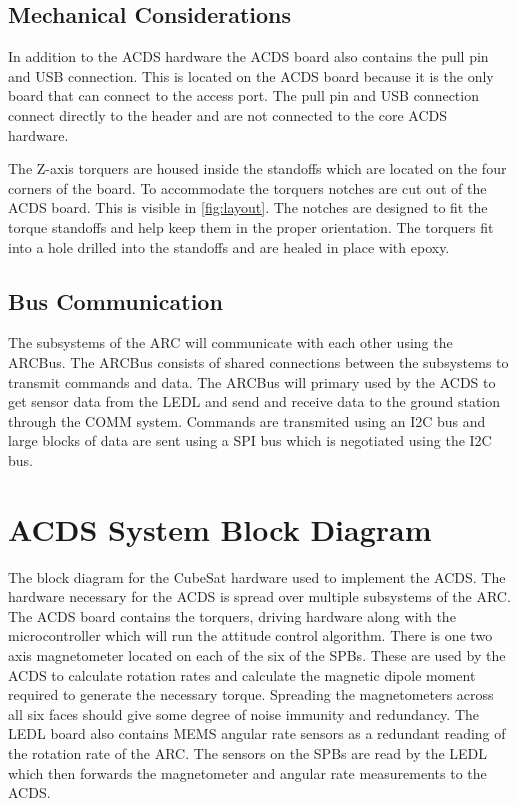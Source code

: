 \subsection{Mechanical Considerations}
In addition to the \ac{ACDS} hardware the \ac{ACDS} board also contains the pull pin and USB connection. This is located on the \ac{ACDS} board because it is the only board that can connect to the access port. The pull pin and USB connection connect directly to the header and are not connected to the core \ac{ACDS} hardware. 

The Z-axis torquers are housed inside the standoffs which are located on the four corners of the board. To accommodate the torquers notches are cut out of the \ac{ACDS} board. This is visible in \autoref{fig:layout}. The notches are designed to fit the torque standoffs and help keep them in the proper orientation. The torquers fit into a hole drilled into the standoffs and are healed in place with epoxy. 


\subsection{Bus Communication}

The subsystems of the \ac{ARC} will communicate with each other using the ARCBus. The ARCBus consists of shared connections between the subsystems to transmit commands and data. The ARCBus will primary used by the \ac{ACDS} to get sensor data from the \ac{LEDL} and send and receive data to the ground station through the COMM system. Commands are transmited using an \ac{I2C} bus and large blocks of data are sent using a SPI bus which is negotiated using the \ac{I2C} bus.

\section{\acl{ACDS} System Block Diagram}

The block diagram for the CubeSat hardware used to implement the \ac{ACDS}. The hardware necessary for the \ac{ACDS} is spread over multiple subsystems of the \ac{ARC}. The \ac{ACDS} board contains the torquers, driving hardware along with the microcontroller which will run the attitude control algorithm. There is one two axis magnetometer located on each of the six of the \acp{SPB}. These are used by the \ac{ACDS} to calculate rotation rates and calculate the magnetic dipole moment required to generate the necessary torque. Spreading the magnetometers across all six faces should give some degree of noise immunity and redundancy. The \ac{LEDL} board also contains \ac{MEMS} angular rate sensors as a redundant reading of the rotation rate of the \ac{ARC}. The sensors on the \acp{SPB} are read by the \ac{LEDL} which then forwards the magnetometer and angular rate measurements to the \ac{ACDS}.

